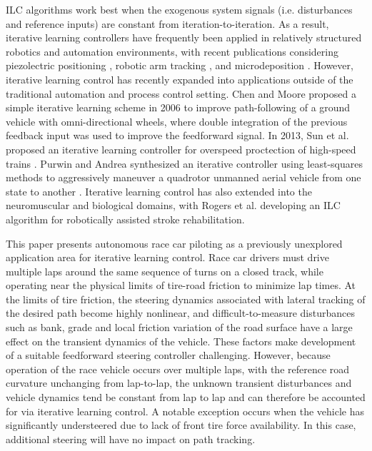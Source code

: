\documentclass[letterpaper, 10 pt, conference]{ieeeconf}  %
\begin{document}
ILC algorithms work best when the exogenous system signals (i.e. disturbances and reference inputs)
are constant from iteration-to-iteration. As a result, iterative learning controllers have frequently been applied in relatively structured robotics and automation environments, with recent publications 
considering piezolectric positioning \cite{huang}, robotic arm tracking \cite{freeman},  and microdeposition \cite{hoelzle}. However, 
iterative learning control has recently expanded into applications
outside of the traditional automation and process control setting. Chen and Moore \cite{chen} proposed a simple iterative learning scheme in 2006 to improve path-following of a ground vehicle with omni-directional wheels, where
 double integration of the previous feedback input was used to improve the feedforward signal. In 2013, Sun et al. proposed an iterative learning controller for overspeed proctection of high-speed
trains \cite{sun}. Purwin and Andrea synthesized an iterative controller using least-squares methods to aggressively maneuver a quadrotor unmanned aerial vehicle from
one state to another \cite{purwin}. Iterative learning control has also extended into the neuromuscular and biological domains, with Rogers et al. \cite{rogers} developing an ILC algorithm 
for robotically assisted stroke rehabilitation.

This paper presents autonomous race car piloting as a previously unexplored application area for iterative learning control. Race car drivers must drive multiple laps around
the same sequence of turns on a closed track, while operating near the physical limits of tire-road friction to minimize lap times.
 At the limits of tire friction, the steering dynamics associated with lateral  tracking of the desired path become highly nonlinear,
and difficult-to-measure disturbances such as bank, grade and local friction variation of the road surface have a large effect on the transient dynamics of the vehicle. 
These factors make development of a suitable feedforward steering controller challenging. However, because operation of the race vehicle 
occurs over multiple laps, with the reference road curvature unchanging from lap-to-lap, the unknown transient disturbances and
 vehicle dynamics tend be constant from lap to lap and can therefore be accounted for via iterative learning control. A notable exception occurs when the vehicle has significantly
 understeered due to lack of front tire force availability. In this case, additional steering will have no impact on path tracking.
 
\end{document}
